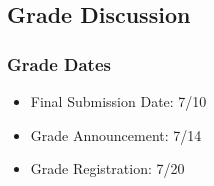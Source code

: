 \subsection{Grade Discussion}

\begin{frame}
  \frametitle{Grade Dates}

  \begin{itemize}
  \item Final Submission Date: 7/10
    \bigskip

  \item Grade Announcement: 7/14
    \bigskip

  \item Grade Registration: 7/20
  \end{itemize}
\end{frame}
